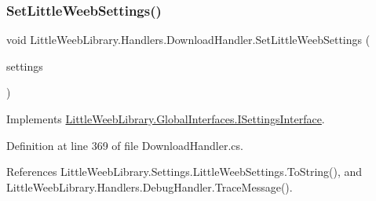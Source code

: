 \subsubsection{\texorpdfstring{Set\+Little\+Weeb\+Settings()}{SetLittleWeebSettings()}}
{\footnotesize\ttfamily void Little\+Weeb\+Library.\+Handlers.\+Download\+Handler.\+Set\+Little\+Weeb\+Settings (\begin{DoxyParamCaption}\item[{\mbox{\hyperlink{class_little_weeb_library_1_1_settings_1_1_little_weeb_settings}{Little\+Weeb\+Settings}}}]{settings }\end{DoxyParamCaption})}



Implements \mbox{\hyperlink{interface_little_weeb_library_1_1_global_interfaces_1_1_i_settings_interface_a5c53e44105f1f4c7f8c3e546d29939d7}{Little\+Weeb\+Library.\+Global\+Interfaces.\+I\+Settings\+Interface}}.



Definition at line 369 of file Download\+Handler.\+cs.



References Little\+Weeb\+Library.\+Settings.\+Little\+Weeb\+Settings.\+To\+String(), and Little\+Weeb\+Library.\+Handlers.\+Debug\+Handler.\+Trace\+Message().


